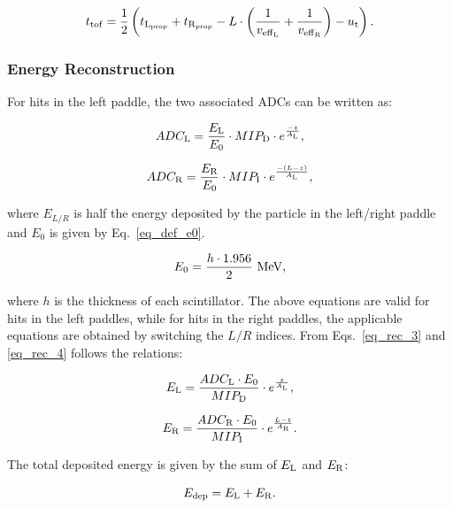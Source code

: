 \documentclass[3p,times,twocolumn]{elsarticle}
\begin{document}
\begin{equation}
t_{\rm{tof}}= \frac{1}{2}\left(t_{\rm{L}_{\rm{prop}}}+t_{\rm{R}_{\rm{prop}}}- L \cdot \left(\frac{1}{v_{\rm{eff}_{\rm{L}}}}
+\frac{1}{v_{\rm{eff}_{\rm{R}}}}\right)  -u_{\rm{t}}\right).
\end{equation}

\subsubsection{Energy Reconstruction}

For hits in the left paddle, the two associated ADCs can be written as:

\begin{equation}
\label{eq_rec_3}
ADC_{\rm{L}}=\frac{E_{\rm{L}}}{E_0}\cdot MIP_{\rm{D}}\cdot e^{\frac{-z}{A_{\rm{L}}}},
\end{equation}

\begin{equation}
\label{eq_rec_4}
ADC_{\rm{R}}=\frac{E_{\rm{R}}}{E_0}\cdot MIP_{\rm{I}}\cdot e^{\frac{-(L-z)}{A_{\rm{L}}}},
\end{equation}

\noindent
where $E_{L/R}$ is half the energy deposited by the particle in the left/right paddle and $E_0$ is given by
Eq.~\ref{eq_def_e0}.

\begin{equation}\label{eq_def_e0}
E_0=\frac{h\cdot 1.956}{2}~\rm{MeV},
\end{equation}

\noindent
where $h$ is the thickness of each scintillator. The above equations are valid for hits in the left paddles, while
for hits in the right paddles, the applicable equations are obtained by switching the $L/R$ indices. From
Eqs.~\ref{eq_rec_3} and \ref{eq_rec_4} follows the relations:

\begin{equation}
E_{\rm{L}}=\frac{ADC_{\rm{L}} \cdot E_0}{MIP_{\rm{D}}}\cdot e^{\frac{z}{A_{\rm{L}}}},
\end{equation}

\begin{equation}
E_{\rm{R}}=\frac{ADC_{\rm{R}} \cdot E_0}{MIP_{\rm{I}}}\cdot e^{\frac{L-z}{A_{\rm{R}}}}.
\end{equation}

\noindent
The total deposited energy is given by the sum of $E_{\rm{L}}$ and $E_{\rm{R}}$:

\begin{equation}
E_{\rm{dep}}=E_{\rm{L}}+E_{\rm{R}}.
\end{equation}
\end{document}
